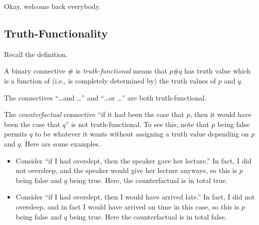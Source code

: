 
Okay, welcome back everybody.

\subsection{Truth-Functionality}
Recall the definition.
\begin{definition}
	A binary connective $\#$ is \textit{truth-functional} means that $p\#q$ has truth value which is a function of (i.e., is completely determined by) the truth values of $p$ and $q$.
\end{definition}
\begin{example}
	The connectives ``\ldots and \ldots'' and ``\ldots or \ldots'' are both truth-functional.
\end{example}
\begin{nex}
	The \textit{counterfactual} connective ``if it had been the case that $p$, then it would have been the case that $q$'' is not truth-functional. To see this, note that $p$ being false permits $q$ to be whatever it wants without assigning a truth value depending on $p$ and $q$. Here are some examples.
	\begin{itemize}
		\item Consider ``if I had overslept, then the speaker gave her lecture.'' In fact, I did not oversleep, and the speaker would give her lecture anyways, so this is $p$ being false and $q$ being true. Here, the counterfactual is in total true.
		\item Consider ``if I had overslept, then I would have arrived late.'' In fact, I did not oversleep, and in fact I would have arrived on time in this case, so this is $p$ being false and $q$ being true. Here the counterfactual is in total false.
	\end{itemize}
\end{nex}

